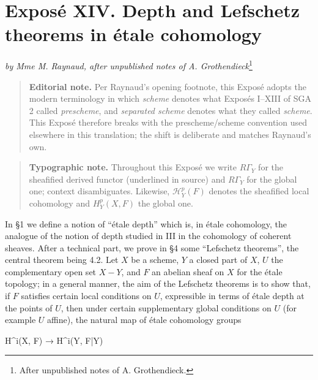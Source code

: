 \documentclass[
]{article}
\newenvironment{Shaded}{}{}
\newcommand{\NormalTok}[1]{#1}
\begin{document}
\section{Exposé XIV. Depth and Lefschetz theorems in étale
cohomology}\label{exposuxe9-xiv.-depth-and-lefschetz-theorems-in-uxe9tale-cohomology}

\emph{by Mme M. Raynaud, after unpublished notes of A.
Grothendieck}\footnote{After unpublished notes of A. Grothendieck.}

\begin{quote}
\textbf{Editorial note.} Per Raynaud's opening footnote, this Exposé
adopts the modern terminology in which \emph{scheme} denotes what
Exposés I--XIII of SGA 2 called \emph{prescheme}, and \emph{separated
scheme} denotes what they called \emph{scheme}. This Exposé therefore
breaks with the prescheme/scheme convention used elsewhere in this
translation; the shift is deliberate and matches Raynaud's own.
\end{quote}

\begin{quote}
\textbf{Typographic note.} Throughout this Exposé we write
\(R\Gamma_{Y}\) for the sheafified derived functor (underlined in
source) and \(R\Gamma_{Y}\) for the global one; context disambiguates.
Likewise, \(\mathcal{H}^{p}_{Y}(F)\) denotes the sheafified local
cohomology and \(H^{p}_{Y}(X, F)\) the global one.
\end{quote}

In §1 we define a notion of ``étale depth'' which is, in étale
cohomology, the analogue of the notion of depth studied in III in the
cohomology of coherent sheaves. After a technical part, we prove in §4
some ``Lefschetz theorems'', the central theorem being 4.2. Let \(X\) be
a scheme, \(Y\) a closed part of \(X\), \(U\) the complementary open set
\(X - Y\), and \(F\) an abelian sheaf on \(X\) for the étale topology;
in a general manner, the aim of the Lefschetz theorems is to show that,
if \(F\) satisfies certain local conditions on \(U\), expressible in
terms of étale depth at the points of \(U\), then under certain
supplementary global conditions on \(U\) (for example \(U\) affine), the
natural map of étale cohomology groups

\begin{Shaded}
\begin{Highlighting}[]
\NormalTok{H\^{}i(X, F) → H\^{}i(Y, F|Y)}
\end{Highlighting}
\end{Shaded}
\end{document}
